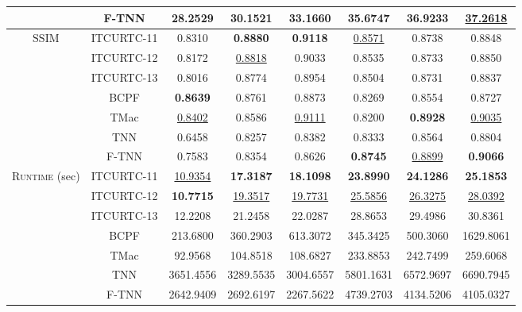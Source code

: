 \documentclass[twoside,12pt]{article}
\begin{document}
\begin{table}[!th]
{\begin{tabular}{|cc|ccc|ccc|}
\multicolumn{1}{|c|}{} & F-TNN &  28.2529&        30.1521&\textbf{33.1660}& \textbf{35.6747}&        \textbf{36.9233}&         \underline{37.2618} \\
\midrule
\multicolumn{1}{|c|}{\multirow{7}{*}{$\mathrm{SSIM}$}} & ITCURTC-11 & 0.8310&         \textbf{0.8880}&         \textbf{0.9118} & \underline{0.8571}&0.8738&         0.8848\\
\multicolumn{1}{|c|}{} & ITCURTC-12 & 0.8172&        \underline{0.8818}&        0.9033 & 0.8535&        0.8733&         0.8850\\ 
\multicolumn{1}{|c|}{} & ITCURTC-13 & 0.8016&       0.8774&         0.8954 &0.8504&         0.8731&0.8837 \\
\multicolumn{1}{|c|}{} & BCPF & \textbf{0.8639}&0.8761&         0.8873&0.8269&         0.8554&        0.8727 \\
\multicolumn{1}{|c|}{} & TMac &  \underline{0.8402}   & 0.8586  &  \underline{0.9111} & 0.8200  &  \textbf{0.8928} &   \underline{0.9035} \\
\multicolumn{1}{|c|}{} & TNN & 0.6458&        0.8257&        0.8382 & 0.8333&         0.8564&        0.8804\\
\multicolumn{1}{|c|}{} & F-TNN &  0.7583&        0.8354&      0.8626& \textbf{0.8745}   &     \underline{0.8899} & \textbf{0.9066} \\
\midrule
\multicolumn{1}{|c|}{\multirow{7}{*}{\textsc{Runtime} (sec)}} & ITCURTC-11 & \underline{10.9354}&        \textbf{17.3187}&         \textbf{18.1098}& \textbf{23.8990}&          \textbf{24.1286}&                \textbf{25.1853} \\
\multicolumn{1}{|c|}{} & ITCURTC-12 & \textbf{10.7715}&          \underline{19.3517}&               \underline{19.7731} & \underline{25.5856}&          \underline{26.3275}&               \underline{28.0392} \\
\multicolumn{1}{|c|}{} & ITCURTC-13 & 12.2208&          21.2458&          22.0287 & 28.8653&                29.4986&          30.8361\\
\multicolumn{1}{|c|}{} & BCPF & 213.6800&          360.2903&              613.3072&  345.3425&          500.3060&         1629.8061
  \\ 
\multicolumn{1}{|c|}{} & TMac &92.9568&          104.8518&          108.6827& 233.8853 & 242.7499&  259.6068\\
\multicolumn{1}{|c|}{} & TNN & 3651.4556&          3289.5535&          3004.6557 & 5801.1631&            6572.9697&         6690.7945\\
\multicolumn{1}{|c|}{} & F-TNN & 2642.9409&          2692.6197&              2267.5622& 4739.2703      &        4134.5206   &           4105.0327\\ 
\bottomrule
\end{tabular}}
\vspace{-5mm}
\end{table}
\end{document}
